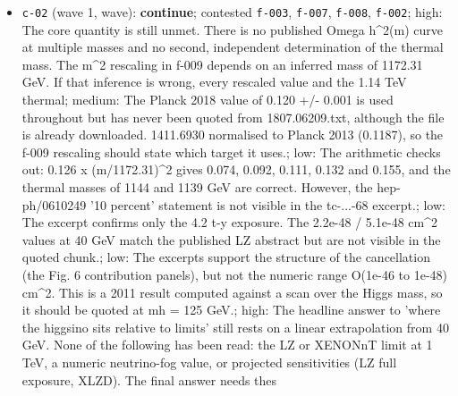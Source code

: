 \documentclass[11pt,a4paper]{article}
\begin{document}
\begin{itemize}
  \item \texttt{c-02} (wave 1, wave): \textbf{continue}; contested \texttt{f-003}, \texttt{f-007}, \texttt{f-008}, \texttt{f-002}; high: The core quantity is still unmet. There is no published Omega h\textasciicircum{}2(m) curve at multiple masses and no second, independent determination of the thermal mass. The m\textasciicircum{}2 rescaling in f-009 depends on an inferred mass of 1172.31 GeV. If that inference is wrong, every rescaled value and the 1.14 TeV thermal; medium: The Planck 2018 value of 0.120 +/- 0.001 is used throughout but has never been quoted from 1807.06209.txt, although the file is already downloaded. 1411.6930 normalised to Planck 2013 (0.1187), so the f-009 rescaling should state which target it uses.; low: The arithmetic checks out: 0.126 x (m/1172.31)\textasciicircum{}2 gives 0.074, 0.092, 0.111, 0.132 and 0.155, and the thermal masses of 1144 and 1139 GeV are correct. However, the hep-ph/0610249 '10 percent' statement is not visible in the tc-...-68 excerpt.; low: The excerpt confirms only the 4.2 t-y exposure. The 2.2e-48 / 5.1e-48 cm\textasciicircum{}2 values at 40 GeV match the published LZ abstract but are not visible in the quoted chunk.; low: The excerpts support the structure of the cancellation (the Fig. 6 contribution panels), but not the numeric range O(1e-46 to 1e-48) cm\textasciicircum{}2. This is a 2011 result computed against a scan over the Higgs mass, so it should be quoted at mh = 125 GeV.; high: The headline answer to 'where the higgsino sits relative to limits' still rests on a linear extrapolation from 40 GeV. None of the following has been read: the LZ or XENONnT limit at 1 TeV, a numeric neutrino-fog value, or projected sensitivities (LZ full exposure, XLZD). The final answer needs thes

\end{itemize}
\end{document}

